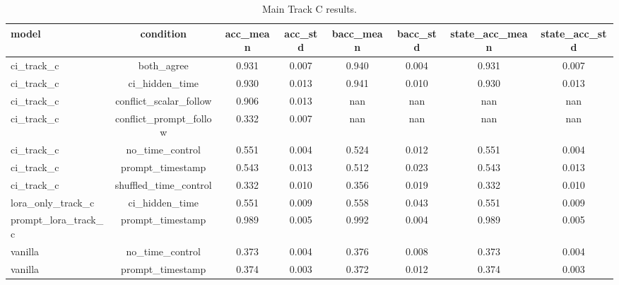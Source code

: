 \begin{table}[t]
\centering
\caption{Main Track C results.}
\label{tab:track-c-main}
\footnotesize
\begin{tabular}{lccccccc}
\toprule
model & condition & acc_mean & acc_std & bacc_mean & bacc_std & state_acc_mean & state_acc_std \\
\midrule
ci_track_c & both_agree & 0.931 & 0.007 & 0.940 & 0.004 & 0.931 & 0.007 \\
ci_track_c & ci_hidden_time & 0.930 & 0.013 & 0.941 & 0.010 & 0.930 & 0.013 \\
ci_track_c & conflict_scalar_follow & 0.906 & 0.013 & nan & nan & nan & nan \\
ci_track_c & conflict_prompt_follow & 0.332 & 0.007 & nan & nan & nan & nan \\
ci_track_c & no_time_control & 0.551 & 0.004 & 0.524 & 0.012 & 0.551 & 0.004 \\
ci_track_c & prompt_timestamp & 0.543 & 0.013 & 0.512 & 0.023 & 0.543 & 0.013 \\
ci_track_c & shuffled_time_control & 0.332 & 0.010 & 0.356 & 0.019 & 0.332 & 0.010 \\
lora_only_track_c & ci_hidden_time & 0.551 & 0.009 & 0.558 & 0.043 & 0.551 & 0.009 \\
prompt_lora_track_c & prompt_timestamp & 0.989 & 0.005 & 0.992 & 0.004 & 0.989 & 0.005 \\
vanilla & no_time_control & 0.373 & 0.004 & 0.376 & 0.008 & 0.373 & 0.004 \\
vanilla & prompt_timestamp & 0.374 & 0.003 & 0.372 & 0.012 & 0.374 & 0.003 \\
\bottomrule
\end{tabular}
\end{table}
